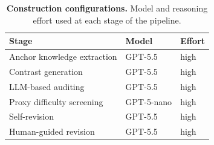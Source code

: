 \begin{table}[t]
\centering
\small
\caption{\textbf{Construction configurations.}
Model and reasoning effort used at each stage of the pipeline.}
\label{tab:construction_config}
\begin{tabular}{@{}lll@{}}
\toprule
\textbf{Stage} & \textbf{Model} & \textbf{Effort} \\
\midrule
Anchor knowledge extraction & GPT-5.5    & high \\
Contrast generation         & GPT-5.5    & high \\
LLM-based auditing          & GPT-5.5    & high \\
Proxy difficulty screening  & GPT-5-nano & high \\
Self-revision               & GPT-5.5    & high \\
Human-guided revision       & GPT-5.5    & high \\
\bottomrule
\end{tabular}
\end{table}